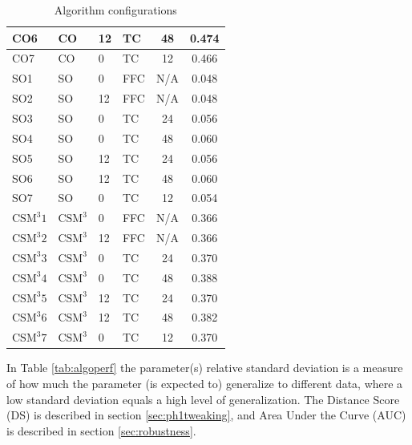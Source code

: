 \begin{table}
\begin{tabular}{| l | l | p{2cm} | p{2cm} | c | c | }
    CO6 & CO & 12 & TC & 48 & 0.474 \\\hline
    CO7 & CO & 0 & TC & 12 & 0.466 \\\hline\hline
%
    SO1 & SO & 0 & FFC & N/A & 0.048 \\\hline
    SO2 & SO & 12 & FFC & N/A & 0.048 \\\hline
    SO3 & SO & 0 & TC & 24 & 0.056 \\\hline
    SO4 & SO & 0 & TC & 48 & 0.060 \\\hline
    SO5 & SO & 12 & TC & 24 & 0.056 \\\hline
    SO6 & SO & 12 & TC & 48 & 0.060 \\\hline
    SO7 & SO & 0 & TC & 12 & 0.054 \\\hline\hline
%
    $\text{CSM}^{3}1$ & $\text{CSM}^{3}$  & 0 & FFC & N/A & 0.366 \\\hline
    $\text{CSM}^{3}2$ &$\text{CSM}^{3}$ & 12 & FFC & N/A & 0.366 \\\hline
    $\text{CSM}^{3}3$ &$\text{CSM}^{3}$ & 0 & TC & 24 & 0.370 \\\hline
    $\text{CSM}^{3}4$ &$\text{CSM}^{3}$ & 0 & TC & 48 & 0.388 \\\hline
    $\text{CSM}^{3}5$ &$\text{CSM}^{3}$ & 12 & TC & 24 & 0.370 \\\hline
    $\text{CSM}^{3}6$ &$\text{CSM}^{3}$ & 12 & TC & 48 & 0.382 \\\hline
    $\text{CSM}^{3}7$ &$\text{CSM}^{3}$ & 0 & TC & 12 & 0.370 \\\hline
%
  \end{tabular}
\caption{Algorithm configurations}
\label{tab:algoconfigs}
\end{table}
%
In Table \ref{tab:algoperf} the parameter(s) relative standard deviation is a measure of how much the parameter (is expected to) generalize to different data, where a low standard deviation equals a high level of generalization. The Distance Score (DS) is described in section \ref{sec:ph1tweaking}, and Area Under the Curve (AUC) is described in section \ref{sec:robustness}.\\
%
